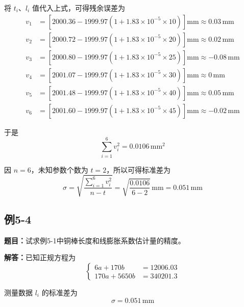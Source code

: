 \documentclass[UTF8,zihao=-4]{ctexart}
\newcommand{\problem}[1]{\subsection*{#1}}
\newcommand{\timu}{\noindent\textbf{题目：}}
\newcommand{\jieda}{\noindent\textbf{解答：}}
\begin{document}
将 $t_i$、$l_i$ 值代入上式，可得残余误差为
\begin{equation*}
\begin{aligned}
    v_1&=
    \left[
    2000.36-1999.97\left(1+1.83\times10^{-5}\times10\right)
    \right]\mathrm{mm}
    \approx0.03\,\mathrm{mm}\\
    v_2&=
    \left[
    2000.72-1999.97\left(1+1.83\times10^{-5}\times20\right)
    \right]\mathrm{mm}
    \approx0.02\,\mathrm{mm}\\
    v_3&=
    \left[
    2000.80-1999.97\left(1+1.83\times10^{-5}\times25\right)
    \right]\mathrm{mm}
    \approx-0.08\,\mathrm{mm}\\
    v_4&=
    \left[
    2001.07-1999.97\left(1+1.83\times10^{-5}\times30\right)
    \right]\mathrm{mm}
    \approx0\,\mathrm{mm}\\
    v_5&=
    \left[
    2001.48-1999.97\left(1+1.83\times10^{-5}\times40\right)
    \right]\mathrm{mm}
    \approx0.05\,\mathrm{mm}\\
    v_6&=
    \left[
    2001.60-1999.97\left(1+1.83\times10^{-5}\times45\right)
    \right]\mathrm{mm}
    \approx-0.02\,\mathrm{mm}
\end{aligned}
\end{equation*}

于是
\begin{equation*}
    \sum_{i=1}^{6}v_i^2=0.0106\,\mathrm{mm}^2
\end{equation*}

因 $n=6$，未知参数个数为 $t=2$，所以可得标准差为
\begin{equation*}
    \sigma
    =
    \sqrt{
    \frac{\displaystyle\sum_{i=1}^{6}v_i^2}{n-t}
    }
    =
    \sqrt{\frac{0.0106}{6-2}}\,\mathrm{mm}
    =
    0.051\,\mathrm{mm}
\end{equation*}

\problem{例5-4}

\timu 试求例5-1中铜棒长度和线膨胀系数估计量的精度。

\jieda 已知正规方程为
\begin{equation*}
\left\{
\begin{aligned}
    6a+170b&=12006.03\\
    170a+5650b&=340201.3
\end{aligned}
\right.
\end{equation*}

测量数据 $l_i$ 的标准差为
\begin{equation*}
    \sigma=0.051\,\mathrm{mm}
\end{equation*}
\end{document}
